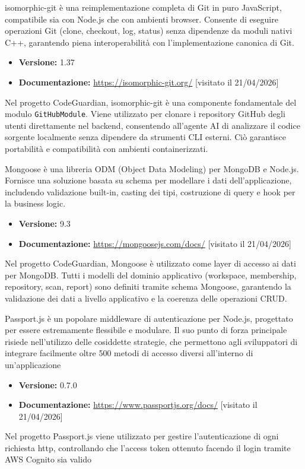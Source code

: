 \documentclass[a4paper, 11pt]{article}
\newcounter{subsubsubsection}[subsubsection]
\begin{document}
isomorphic-git è una reimplementazione completa di Git in puro JavaScript, compatibile sia con Node.js che con ambienti browser. Consente di eseguire operazioni Git (clone, checkout, log, status) senza dipendenze da moduli nativi C++, garantendo piena interoperabilità con l'implementazione canonica di Git.
\begin{itemize}
  \item \textbf{Versione:} 1.37
  \item \textbf{Documentazione:} \url{https://isomorphic-git.org/} [visitato il 21/04/2026]
\end{itemize}
Nel progetto CodeGuardian, isomorphic-git è una componente fondamentale del modulo \texttt{GitHubModule}. Viene utilizzato per clonare i repository GitHub degli utenti direttamente nel backend, consentendo all'agente AI di analizzare il codice sorgente localmente senza dipendere da strumenti CLI esterni. Ciò garantisce portabilità e compatibilità con ambienti containerizzati.

Mongoose è una libreria ODM (Object Data Modeling) per MongoDB e Node.js. Fornisce una soluzione basata su schema per modellare i dati dell'applicazione, includendo validazione built-in, casting dei tipi, costruzione di query e hook per la business logic.
\begin{itemize}
  \item \textbf{Versione:} 9.3
  \item \textbf{Documentazione:} \url{https://mongoosejs.com/docs/} [visitato il 21/04/2026]
\end{itemize}
Nel progetto CodeGuardian, Mongoose è utilizzato come layer di accesso ai dati per MongoDB\@. Tutti i modelli del dominio applicativo (workspace, membership, repository, scan, report) sono definiti tramite schema Mongoose, garantendo la validazione dei dati a livello applicativo e la coerenza delle operazioni CRUD\@.

Passport.js è un popolare middleware di autenticazione per Node.js, progettato per essere estremamente flessibile e modulare. Il suo punto di forza principale risiede nell'utilizzo delle cosiddette strategie, che permettono agli sviluppatori di integrare facilmente oltre 500 metodi di accesso diversi all'interno di un'applicazione
\begin{itemize}
  \item \textbf{Versione:} 0.7.0
  \item \textbf{Documentazione:} \url{https://www.passportjs.org/docs/} [visitato il 21/04/2026]
\end{itemize}
Nel progetto Passport.js viene utilizzato per gestire l'autenticazione di ogni richiesta http, controllando che l'access token ottenuto facendo il login tramite AWS Cognito sia valido
\end{document}

